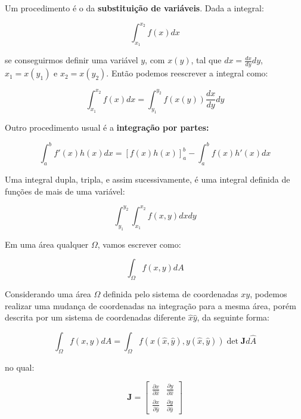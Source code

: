         Um procedimento é o da \textbf{substituição de variáveis}. Dada a integral:

        \begin{equation*}
            \int_{x_1}^{x_2} f(x) dx
        \end{equation*}
        
        \noindent se conseguirmos definir uma variável $y$, com $x(y)$, tal que $dx = \frac{dx}{dy} dy$, $x_1 = x(y_1)$ e $x_2 = x(y_2)$. Então podemos reescrever a integral como:

        \begin{equation*}
            \int_{x_1}^{x_2} f(x) dx = 
            \int_{y_1}^{y_2} f(x(y)) \frac{dx}{dy} dy
        \end{equation*}
        
        Outro procedimento usual é a \textbf{integração por partes:}

        \begin{equation}
            \int_{a}^{b} f'(x) h(x) dx = \left[f(x)h(x)\right]_{a}^{b} - \int_{a}^{b} f(x) h'(x) dx
        \end{equation}


        Uma integral dupla, tripla, e assim sucessivamente, é uma integral definida de funções de mais de uma variável:

        \begin{equation*}
            \int_{y_1}^{y_2} \int_{x_1}^{x_2} f(x,y) dx dy
        \end{equation*}

        Em uma área qualquer $\Omega$, vamos escrever como:

        \begin{equation*}
            \int_{\Omega} f(x,y) dA
        \end{equation*}

        Considerando uma área $\Omega$ definida pelo sistema de coordenadas $xy$, podemos realizar uma mudança de coordenadas na integração para a mesma área, porém descrita por um sistema de coordenadas diferente $\hat{x}\hat{y}$, da seguinte forma:

        \begin{equation*}
            \int_{\Omega} f(x,y) dA = \int_{\Omega} f(x(\hat{x},\hat{y}),y(\hat{x},\hat{y})) \det \mathbf{J} d\hat{A}
        \end{equation*}

        \noindent no qual:

        \begin{equation*}
            \mathbf{J} = 
            \begin{bmatrix}
                \frac{\partial x}{\partial \hat{x}} & \frac{\partial y}{\partial \hat{x}}\\
                \frac{\partial x}{\partial \hat{y}} & \frac{\partial y}{\partial \hat{y}}
            \end{bmatrix}
        \end{equation*}

